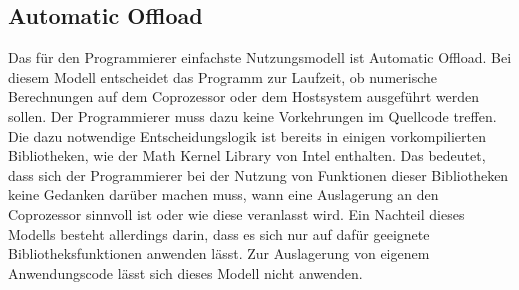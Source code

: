 \documentclass[../main.tex]{subfiles}
\begin{document}
\subsection{Automatic Offload}
Das für den Programmierer einfachste Nutzungsmodell ist Automatic Offload. Bei diesem Modell entscheidet das Programm zur Laufzeit, ob numerische Berechnungen auf dem Coprozessor oder dem Hostsystem ausgeführt werden sollen. Der Programmierer muss dazu keine Vorkehrungen im Quellcode treffen. Die dazu notwendige Entscheidungslogik ist bereits in einigen vorkompilierten Bibliotheken, wie der Math Kernel Library von Intel enthalten. Das bedeutet, dass sich der Programmierer bei der Nutzung von Funktionen dieser Bibliotheken keine Gedanken darüber machen muss, wann eine Auslagerung an den Coprozessor sinnvoll ist oder wie diese veranlasst wird. Ein Nachteil dieses Modells besteht allerdings darin, dass es sich nur auf dafür geeignete Bibliotheksfunktionen anwenden lässt. Zur Auslagerung von eigenem Anwendungscode lässt sich dieses Modell nicht anwenden. 
\end{document}
